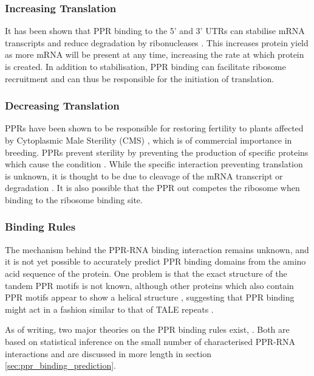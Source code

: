 \subsubsection{Increasing Translation}

It has been shown that PPR binding to the 5' and 3' UTRs can stabilise mRNA
transcripts and reduce degradation by
ribonucleases \citep{Pfalz2009,Prikryl2011}.
This increases protein yield as more mRNA will be present at any time,
increasing the rate at which protein is created.
In addition to stabilisation, PPR binding can facilitate ribosome recruitment
and can thus be responsible for the initiation of translation.

\subsubsection{Decreasing Translation}

PPRs have been shown to be responsible for restoring fertility to plants
affected by Cytoplasmic Male Sterility (CMS) \citep{Bentolila2002}, which is of
commercial importance in breeding.
PPRs prevent sterility by preventing the production of specific proteins which
cause the condition \citep{Kazama2008}.
While the specific interaction preventing translation is unknown, it is thought
to be due to cleavage of the mRNA transcript or degradation \citep{Wang2006}.
It is also possible that the PPR out competes the ribosome when binding to the
ribosome binding site.

\subsubsection{Binding Rules}

The mechanism behind the PPR-RNA binding interaction remains unknown, 
and it is not yet
possible to accurately predict PPR binding domains from the amino acid sequence
of the protein.
One problem is that the exact structure of the tandem PPR motifs is not known,
although other proteins which also contain PPR motifs appear to show a helical
structure \citep{Ringel2011,Howard2012}, suggesting that PPR binding might act
in a fashion similar to that of TALE repeats \citep{Rubinson2012}.

As of writing, two major theories on the PPR binding rules exist,
\citep{Barkan2012,Yagi2013}.
Both are based on statistical inference on the small number of characterised
PPR-RNA interactions and are discussed in more length in section
\ref{sec:ppr_binding_prediction}.

